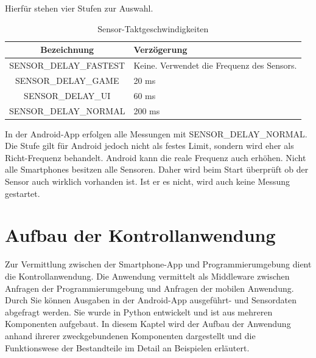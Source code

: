 \documentclass[11pt,a4paper]{report}
\begin{document}
Hierfür stehen vier Stufen zur Auswahl.
\begin{table}[htbp]
  \centering
  \begin{tabular}{|c|p{4cm}|}
      \hline
      \textbf{Bezeichnung} & \textbf{Verzögerung} \\
	  \hline
      SENSOR\_DELAY\_FASTEST & Keine. Verwendet die Frequenz des Sensors.\\
      \hline
      SENSOR\_DELAY\_GAME & 20 ms\\
      \hline
      SENSOR\_DELAY\_UI & 60 ms\\
      \hline
      SENSOR\_DELAY\_NORMAL & 200 ms\\
      \hline
  \end{tabular}
  \caption{Sensor-Taktgeschwindigkeiten\cite{sensor-takt}}
  \label{tab:sensor_speeds}
\end{table}
In der Android-App erfolgen alle Messungen mit SENSOR\_DELAY\_NORMAL.
Die Stufe gilt für Android jedoch nicht als festes Limit, sondern wird eher als Richt-Frequenz behandelt.
Android kann die reale Frequenz auch erhöhen.
Nicht alle Smartphones besitzen alle Sensoren.
Daher wird beim Start überprüft ob der Sensor auch wirklich vorhanden ist.
Ist er es nicht, wird auch keine Messung gestartet.

\chapter{Aufbau der Kontrollanwendung}\label{chap:server_software}
Zur Vermittlung zwischen der Smartphone-App und Programmierumgebung dient die Kontrollanwendung.
Die Anwendung vermittelt als Middleware zwischen Anfragen der Programmierumgebung und Anfragen der mobilen Anwendung.
Durch Sie können Ausgaben in der Android-App ausgeführt- und Sensordaten abgefragt werden.
Sie wurde in Python entwickelt und ist aus mehreren Komponenten aufgebaut.
In diesem Kaptel wird der Aufbau der Anwendung anhand ihrerer zweckgebundenen Komponenten dargestellt und die Funktionswese der Bestandteile im Detail an Beispielen erläutert.
\end{document}
